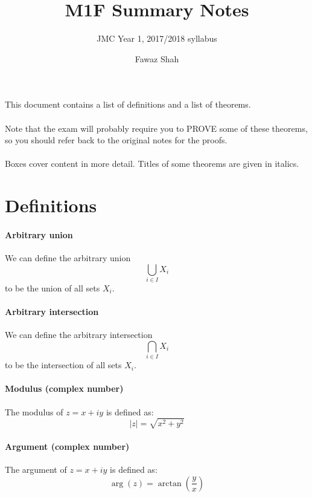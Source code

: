\documentclass{scrartcl}
\title{M1F Summary Notes}
\subtitle{JMC Year 1, 2017/2018 syllabus}
\date{}
\author{Fawaz Shah}
\begin{document}
\large
\maketitle
\noindent This document contains a list of definitions and a list of theorems.
\\\\
Note that the exam will probably require you to PROVE some of these theorems, so you should refer back to the original notes for the proofs.
\\\\
Boxes cover content in more detail. Titles of some theorems are given in italics.
\tableofcontents
\newpage

\section{Definitions}

\paragraph{Arbitrary union}
We can define the arbitrary union
\begin{equation}
\bigcup_{i \in I} X_{i}
\end{equation}
to be the union of all sets $ X_{i} $.

\paragraph{Arbitrary intersection}
We can define the arbitrary intersection
\begin{equation}
\bigcap_{i \in I} X_{i}
\end{equation}
to be the intersection of all sets $ X_{i} $.

\paragraph{Modulus (complex number)}
The modulus of $ z = x + iy $ is defined as:
\begin{equation}
|z| = \sqrt{x^{2} + y^{2}}
\end{equation}

\paragraph{Argument (complex number)}
The argument of $ z = x + iy $ is defined as:
\begin{equation}
\arg(z) = \arctan(\frac{y}{x})
\end{equation}
\end{document}
